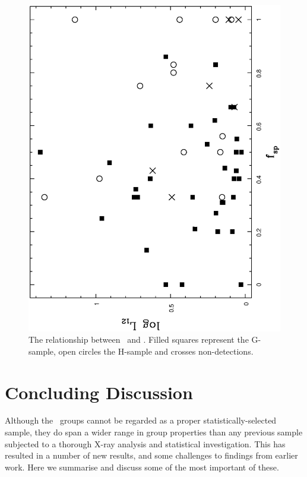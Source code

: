 \documentclass[usenatbib]{mn2e}
\begin{document}
\begin{figure}

  \includegraphics[height=\linewidth,angle=270]{fig_31.ps}
  \caption{The relationship between \dom\ and \fsp.  Filled squares represent
           the G-sample, open circles the H-sample and crosses non-detections.}
  \label{fig_dom_fsp}

\end{figure}


\section{Concluding Discussion}
\label{sec_conc}

Although the \GEMS\ groups cannot be regarded as a proper statistically-selected
sample, they do span a wider range in group properties than any previous sample
subjected to a thorough X-ray analysis and statistical investigation.  This has
resulted in a number of new results, and some challenges to findings from earlier
work.  Here we summarise and discuss some of the most important of these.

\end{document}
